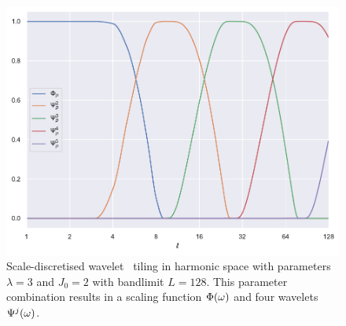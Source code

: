 \begin{figure}[htpb]
	\centering\capstart{}
	\includegraphics[width=\textwidth]{axisymmetric_tiling_L128.pdf}
	\caption[
		The tiling of the harmonic line used in scale-discretised wavelets
	]{
		Scale-discretised wavelet~\cite{Wiaux2008,McEwen2018,Leistedt2013,McEwen2013,McEwen2015} tiling in harmonic space with parameters \(\lambda=3\) and \(J_{0}=2\) with bandlimit \(L=128\).
		This parameter combination results in a scaling function \(\Phi(\omega)\) and four wavelets \(\Psi^{j}(\omega)\).
	}\label{fig:chapter2_tiling}
\end{figure}
